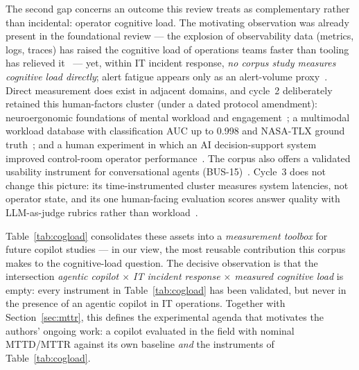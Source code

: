 \documentclass{ieeeaccess}
\begin{document}
The second gap concerns an outcome this review treats as complementary
rather than incidental: operator cognitive load. The motivating
observation was already present in the foundational review --- the
explosion of observability data (metrics, logs, traces) has raised the
cognitive load of operations teams faster than tooling has relieved
it~\cite{P05,P16} --- yet, within IT incident response, \emph{no corpus
study measures cognitive load directly}; alert fatigue appears only as
an alert-volume proxy~\cite{P73}. Direct measurement does exist in
adjacent domains, and cycle~2 deliberately retained this human-factors
cluster (under a dated protocol amendment):
neuroergonomic foundations of mental workload and
engagement~\cite{P62}; a multimodal workload database with
classification AUC up to 0.998 and NASA-TLX ground truth~\cite{P69};
and a human experiment in which an AI decision-support system improved
control-room operator performance~\cite{P81}. The corpus also offers a
validated usability instrument for conversational agents
(BUS-15)~\cite{P63}. Cycle~3 does not change this picture: its
time-instrumented cluster measures system latencies, not operator state,
and its one human-facing evaluation scores answer quality with
LLM-as-judge rubrics rather than workload~\cite{P119}.

Table~\ref{tab:cogload} consolidates these assets into a
\emph{measurement toolbox} for future copilot studies --- in our view,
the most reusable contribution this corpus makes to the cognitive-load
question. The decisive observation is that the intersection
\emph{agentic copilot $\times$ IT incident response $\times$ measured
cognitive load} is empty: every instrument in
Table~\ref{tab:cogload} has been validated, but never in the presence
of an agentic copilot in IT operations. Together with
Section~\ref{sec:mttr}, this defines the experimental agenda that
motivates the authors' ongoing work: a copilot evaluated in the field
with nominal MTTD/MTTR against its own baseline \emph{and} the
instruments of Table~\ref{tab:cogload}.
\end{document}
